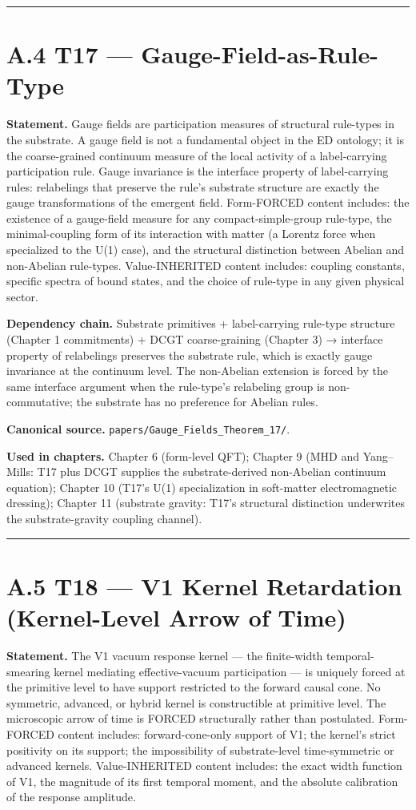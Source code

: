 \documentclass[11pt]{book}
\begin{document}
\bigskip\hrule\bigskip

\section{A.4 T17 — Gauge-Field-as-Rule-Type}

\textbf{Statement.} Gauge fields are participation measures of structural rule-types in the substrate. A gauge field is not a fundamental object in the ED ontology; it is the coarse-grained continuum measure of the local activity of a label-carrying participation rule. Gauge invariance is the interface property of label-carrying rules: relabelings that preserve the rule's substrate structure are exactly the gauge transformations of the emergent field. Form-FORCED content includes: the existence of a gauge-field measure for any compact-simple-group rule-type, the minimal-coupling form of its interaction with matter (a Lorentz force when specialized to the U(1) case), and the structural distinction between Abelian and non-Abelian rule-types. Value-INHERITED content includes: coupling constants, specific spectra of bound states, and the choice of rule-type in any given physical sector.

\textbf{Dependency chain.} Substrate primitives + label-carrying rule-type structure (Chapter 1 commitments) + DCGT coarse-graining (Chapter 3) → interface property of relabelings preserves the substrate rule, which is exactly gauge invariance at the continuum level. The non-Abelian extension is forced by the same interface argument when the rule-type's relabeling group is non-commutative; the substrate has no preference for Abelian rules.

\textbf{Canonical source.} \texttt{papers/Gauge\_Fields\_Theorem\_17/}.

\textbf{Used in chapters.} Chapter 6 (form-level QFT); Chapter 9 (MHD and Yang–Mills: T17 plus DCGT supplies the substrate-derived non-Abelian continuum equation); Chapter 10 (T17's U(1) specialization in soft-matter electromagnetic dressing); Chapter 11 (substrate gravity: T17's structural distinction underwrites the substrate-gravity coupling channel).

\bigskip\hrule\bigskip

\section{A.5 T18 — V1 Kernel Retardation (Kernel-Level Arrow of Time)}

\textbf{Statement.} The V1 vacuum response kernel — the finite-width temporal-smearing kernel mediating effective-vacuum participation — is uniquely forced at the primitive level to have support restricted to the forward causal cone. No symmetric, advanced, or hybrid kernel is constructible at primitive level. The microscopic arrow of time is FORCED structurally rather than postulated. Form-FORCED content includes: forward-cone-only support of V1; the kernel's strict positivity on its support; the impossibility of substrate-level time-symmetric or advanced kernels. Value-INHERITED content includes: the exact width function of V1, the magnitude of its first temporal moment, and the absolute calibration of the response amplitude.
\end{document}
